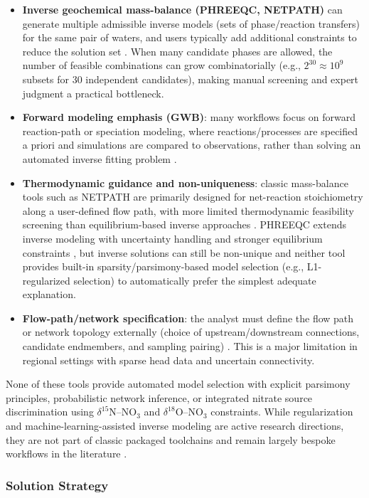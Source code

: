 \documentclass[12pt,a4paper]{article}
\theoremstyle{plain}
\theoremstyle{definition}
\theoremstyle{remark}
\begin{document}
\begin{itemize}
	\item \textbf{Inverse geochemical mass-balance (PHREEQC, NETPATH)} can generate multiple admissible inverse models (sets of phase/reaction transfers) for the same pair of waters, and users typically add additional constraints to reduce the solution set \cite{parkhurst2013, plummer1994}. When many candidate phases are allowed, the number of feasible combinations can grow combinatorially (e.g., $2^{30} \approx 10^9$ subsets for 30 independent candidates), making manual screening and expert judgment a practical bottleneck.
	\item \textbf{Forward modeling emphasis (GWB)}: many workflows focus on forward reaction-path or speciation modeling, where reactions/processes are specified a priori and simulations are compared to observations, rather than solving an automated inverse fitting problem \cite{gwb}.
	\item \textbf{Thermodynamic guidance and non-uniqueness}: classic mass-balance tools such as NETPATH are primarily designed for net-reaction stoichiometry along a user-defined flow path, with more limited thermodynamic feasibility screening than equilibrium-based inverse approaches \cite{plummer1994}. PHREEQC extends inverse modeling with uncertainty handling and stronger equilibrium constraints \cite{parkhurst2013}, but inverse solutions can still be non-unique and neither tool provides built-in sparsity/parsimony-based model selection (e.g., L1-regularized selection) to automatically prefer the simplest adequate explanation.
	\item \textbf{Flow-path/network specification}: the analyst must define the flow path or network topology externally (choice of upstream/downstream connections, candidate endmembers, and sampling pairing) \cite{plummer1994}. This is a major limitation in regional settings with sparse head data and uncertain connectivity.
\end{itemize}

None of these tools provide automated model selection with explicit parsimony principles, probabilistic network inference, or integrated nitrate source discrimination using $\delta^{15}$N--NO$_3$ and $\delta^{18}$O--NO$_3$ constraints. While regularization and machine-learning-assisted inverse modeling are active research directions, they are not part of classic packaged toolchains and remain largely bespoke workflows in the literature \cite{wang2025, gholami2024}.

\subsubsection{Solution Strategy}
\end{document}
